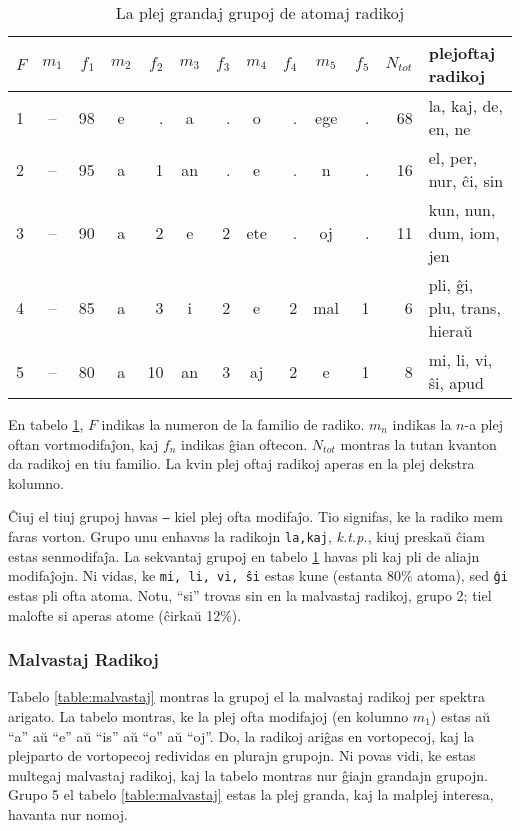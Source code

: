 \documentclass[12pt,twoside]{article}
\begin{document}
\vspace{.2 in}
\begin{table}[h!]
\begin{center}
\begin{tabular}{ |l||c|r||c|r||c|r||c|r||c|r||r|l| }
\hline
$F$& $m_1$ & $f_1$&$m_2$ & $f_2$&$m_3$ & $f_3$& $m_4$  & $f_4$& $m_5$ & $f_5$& $N_{tot}$ &   plejoftaj radikoj     \\
\hline
1   &--  &98   &e    &.   &a    &.    &o    &.  &ege    &.  &68          &la, kaj, de, en, ne \\
2   &--  &95   &a    &1  &an    &.    &e    &.    &n    &.  &16        &el, per, nur, ĉi, sin \\
3   &--  &90   &a    &2   &e    &2  &ete    &.   &oj    &.  &11      &kun, nun, dum, iom, jen \\
4   &--  &85   &a    &3   &i    &2    &e    &2  &mal    &1   &6  &pli, ĝi, plu, trans, hieraŭ \\
5   &--  &80   &a   &10  &an    &3   &aj    &2    &e    &1   &8         &mi, li, vi, ŝi, apud \\
\hline
\end{tabular}
\caption{La plej grandaj grupoj de atomaj radikoj}\label{table:atomoj}
\end{center}
\end{table}
\vspace{.2 in}

En tabelo \ref{table:atomoj}, $F$ indikas la numeron de la familio de radiko. $m_n$ indikas la $n$-a plej oftan vortmodifaĵon, 
kaj $f_n$ indikas ĝian oftecon. $N_{tot}$ montras la tutan kvanton da radikoj en tiu familio. La kvin plej oftaj
radikoj aperas en la plej dekstra kolumno.

Ĉiuj el tiuj grupoj havas \texttt{--} kiel plej ofta modifaĵo. Tio signifas, ke la radiko mem faras 
vorton. Grupo unu enhavas la radikojn \texttt{la,kaj}, \textit{k.t.p.}, kiuj preskaŭ ĉiam estas senmodifaĵa.
La sekvantaj grupoj en tabelo \ref{table:atomoj} havas pli kaj pli de aliajn modifaĵojn. Ni vidas,
ke \texttt{mi, li, vi, ŝi} estas kune (estanta 80\% atoma), sed \texttt{ĝi} estas pli ofta atoma.  
Notu, ``si'' trovas sin en la malvastaj radikoj, grupo 2; tiel malofte si aperas atome (ĉirkaŭ 12\%).

\subsubsection{Malvastaj Radikoj}
Tabelo \ref{table:malvastaj} montras la grupoj el la malvastaj radikoj per spektra arigato. 
La tabelo montras, ke la plej ofta modifajoj (en kolumno $m_1$) estas aŭ ``a'' aŭ ``e'' aŭ ``is'' aŭ ``o'' aŭ ``oj''.
Do, la radikoj ariĝas en vortopecoj, kaj la plejparto de vortopecoj redividas en plurajn grupojn.
Ni povas vidi, ke estas multegaj malvastaj radikoj, kaj la tabelo montras nur ĝiajn grandajn grupojn.
Grupo 5 el tabelo \ref{table:malvastaj} estas la plej granda, kaj la malplej interesa, havanta nur nomoj.
\end{document}
